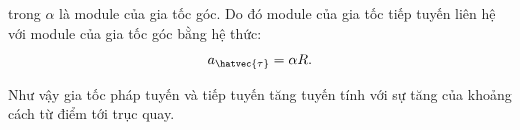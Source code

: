 \noindent
trong $\alpha$ là module của gia tốc góc. Do đó module của gia tốc tiếp tuyến liên hệ với module của gia tốc góc bằng hệ thức:
\begin{equation}\label{eq:1_103}
a_{\hatvec{\tau}} = \alpha R.
\end{equation}

Như vậy gia tốc pháp tuyến và tiếp tuyến tăng tuyến tính với sự tăng của khoảng cách từ điểm tới trục quay.
